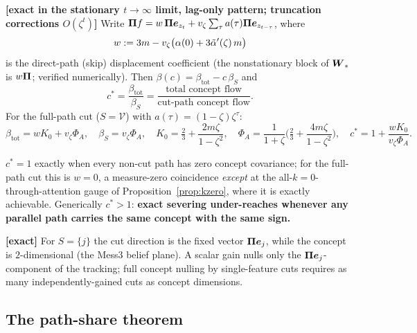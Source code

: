 \documentclass{article}
\begin{document}
\begin{prop}\label{prop:m1null}
\textbf{[exact in the stationary $t \to \infty$ limit, lag-only pattern; truncation corrections $O(\zeta^t)$]} Write $\boldsymbol{\Pi} f = w\,\boldsymbol{\Pi}\boldsymbol{e}_{z_t} + v_\zeta\sum_\tau a(\tau)\boldsymbol{\Pi}\boldsymbol{e}_{z_{t-\tau}}$, where
\begin{equation}
    w := 3m - v_\zeta\big(\alpha(0) + 3\Tilde{\alpha}'(\zeta)\, m\big)
\end{equation}
is the direct-path (skip) displacement coefficient (the nonstationary block of $\boldsymbol{W}_*$ is $w\boldsymbol{\Pi}$; verified numerically). Then $\beta(c) = \beta_{\mathrm{tot}} - c\,\beta_S$ and
\begin{equation}
    c^* = \frac{\beta_{\mathrm{tot}}}{\beta_S} = \frac{\text{total concept flow}}{\text{cut-path concept flow}} .
\end{equation}
For the full-path cut ($S = \mathcal{V}$) with $a(\tau) = (1-\zeta)\zeta^\tau$:
\begin{equation}
    \beta_{\mathrm{tot}} = w K_0 + v_\zeta\Phi_A, \quad \beta_S = v_\zeta\Phi_A, \quad
    K_0 = \tfrac23 + \frac{2m\zeta}{1-\zeta^2}, \quad
    \Phi_A = \frac{1}{1+\zeta}\Big(\tfrac23 + \frac{4m\zeta}{1-\zeta^2}\Big), \quad
    c^* = 1 + \frac{w K_0}{v_\zeta\Phi_A} .
\end{equation}
\end{prop}

\begin{corollary}\label{cor:severing}
$c^* = 1$ exactly when every non-cut path has zero concept covariance; for the full-path cut this is $w = 0$, a measure-zero coincidence \emph{except} at the all-$k{=}0$-through-attention gauge of Proposition~\ref{prop:kzero}, where it is exactly achievable. Generically $c^* > 1$: \textbf{exact severing under-reaches whenever any parallel path carries the same concept with the same sign.}
\end{corollary}

\begin{corollary}
\textbf{[exact]} For $S = \{j\}$ the cut direction is the fixed vector $\boldsymbol{\Pi}\boldsymbol{e}_j$, while the concept is $2$-dimensional (the Mess3 belief plane). A scalar gain nulls only the $\boldsymbol{\Pi}\boldsymbol{e}_j$-component of the tracking; full concept nulling by single-feature cuts requires as many independently-gained cuts as concept dimensions.
\end{corollary}

\subsection{The path-share theorem}
\end{document}
